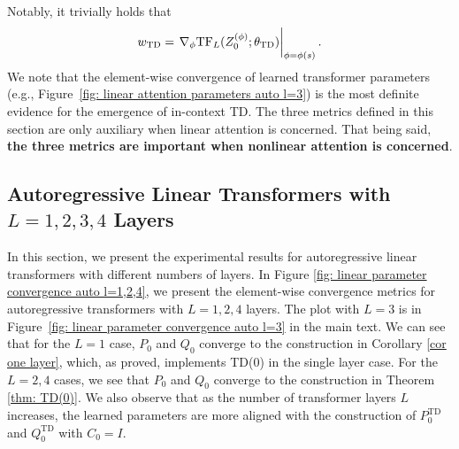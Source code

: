 \documentclass{article}
\newcommand{\tb}[1]{{\textbf{#1}}}
\newcommand{\tf}{\text{TF}}
\newcommand{\td}{\text{TD}}
\begin{document}
Notably,
it trivially holds that
\begin{align}
    w_\td = \eval{\nabla_{\phi} \tf_L(Z_0^{(\phi)}; \theta_\td)}_{\phi = \phi(s)}.
\end{align}
We note that the element-wise convergence of learned transformer parameters (e.g., Figure~\ref{fig: linear attention parameters auto l=3}) is the most definite evidence for the emergence of in-context TD.
The three metrics defined in this section are only auxiliary when linear attention is concerned.
That being said,
\tb{the three metrics are important when nonlinear attention is concerned}.
\subsection[Autoregressive Linear Transformers with L = 1, 2, 3, 4 Layers]{Autoregressive Linear Transformers with $L=1,2,3,4$ Layers} \label{appendix: autoregressive experiments}
In this section,
we present the experimental results for autoregressive linear transformers with different numbers of layers.
In Figure \ref{fig: linear parameter convergence auto l=1,2,4}, we present the element-wise convergence metrics for autoregressive transformers with $L=1,2,4$ layers.
The plot with $L = 3$ is in Figure~\ref{fig: linear parameter convergence auto l=3} in the main text.
We can see that for the $L=1$ case, $P_0$ and $Q_0$ converge to the construction in Corollary \ref{cor one layer},
which, as proved, implements TD(0) in the single layer case.
For the $L=2,4$ cases, we see that $P_0$ and $Q_0$ converge to the construction in Theorem \ref{thm: TD(0)}.
We also observe that as the number of transformer layers $L$ increases,
the learned parameters are more aligned with the construction of $P_0^{\td}$ and $Q_0^{\td}$ with $C_0=I$.
\end{document}

